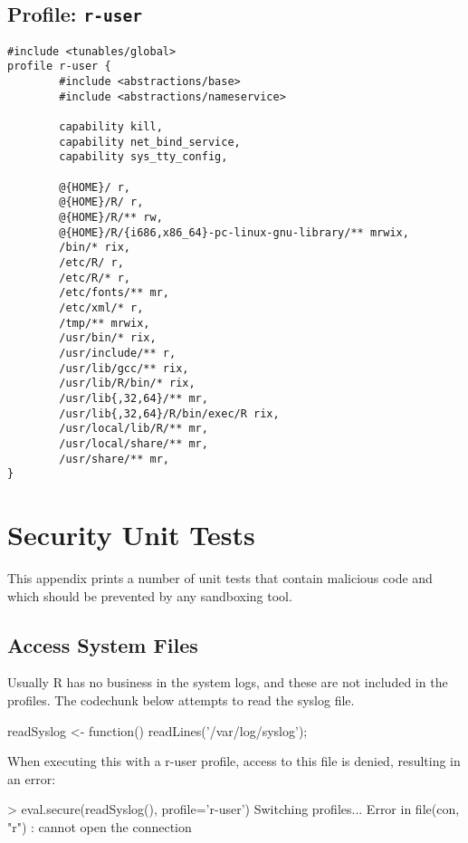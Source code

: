 \documentclass[article]{jss}
\newcommand{\R}{\textsf{R}\xspace}
\begin{document}
\begin{appendices}
\subsection[Profile: r-user]{Profile: \texttt{r-user}}
\label{r-user}

\begin{verbatim}
#include <tunables/global>
profile r-user {
        #include <abstractions/base>
        #include <abstractions/nameservice>
	
        capability kill,
        capability net_bind_service,
        capability sys_tty_config,
	
        @{HOME}/ r,
        @{HOME}/R/ r,
        @{HOME}/R/** rw,
        @{HOME}/R/{i686,x86_64}-pc-linux-gnu-library/** mrwix,
        /bin/* rix,
        /etc/R/ r,
        /etc/R/* r,
        /etc/fonts/** mr,
        /etc/xml/* r,
        /tmp/** mrwix,
        /usr/bin/* rix,
        /usr/include/** r,
        /usr/lib/gcc/** rix,		
        /usr/lib/R/bin/* rix,
        /usr/lib{,32,64}/** mr,
        /usr/lib{,32,64}/R/bin/exec/R rix,
        /usr/local/lib/R/** mr,
        /usr/local/share/** mr,
        /usr/share/** mr,
}
\end{verbatim}



\section{Security Unit Tests}

This appendix prints a number of unit tests that contain malicious code and
which should be prevented by any sandboxing tool.

\subsection{Access System Files}

Usually \R has no business in the system logs, and these are not included in the
profiles. The codechunk below attempts to read the syslog file.
\begin{CodeChunk}
\begin{CodeInput}
readSyslog <- function(){
	readLines('/var/log/syslog');
}
\end{CodeInput}
\end{CodeChunk}
When executing this with a r-user profile, access to this file is denied,
resulting in an error:
\begin{CodeChunk}
\begin{CodeInput}
> eval.secure(readSyslog(), profile='r-user')
Switching profiles...
Error in file(con, "r") : cannot open the connection
\end{CodeInput}
\end{CodeChunk}


\end{appendices}
\end{document}
